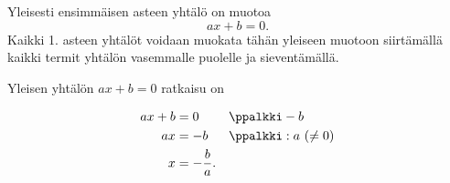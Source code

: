 Yleisesti ensimmäisen asteen yhtälö on muotoa
\[
    ax + b = 0.
\]
Kaikki 1. asteen yhtälöt voidaan muokata tähän yleiseen
muotoon siirtämällä kaikki termit yhtälön vasemmalle puolelle ja
sieventämällä.

Yleisen yhtälön $ax + b = 0$ ratkaisu on

\begin{align*}
	 ax + b &= 0  && \ppalkki -b\\
	 ax &= -b  && \ppalkki : a \ (\neq 0)\\
  x &= -\frac{b}{a}.
\end{align*}

